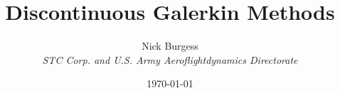 \documentclass[10pt]{report}
\numberwithin{equation}{section}
\begin{document}
 \title{Discontinuous Galerkin Methods}
 \date{\today}
 \author{Nick Burgess \\
  \emph{STC Corp. and U.S. Army Aeroflightdynamics Directorate}}
\maketitle

 \tableofcontents        %
 \listoffigures          %
 \listoftables           %





\end{document}
